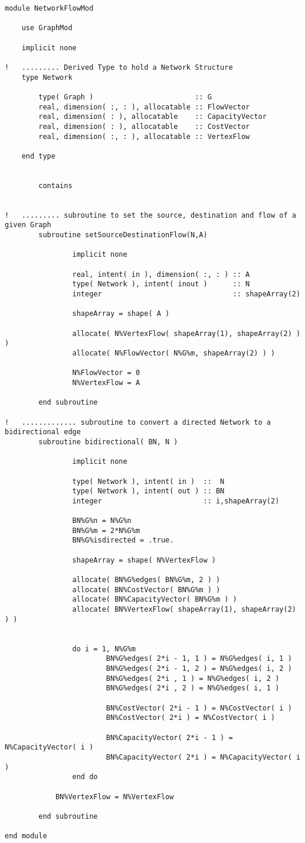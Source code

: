 \documentclass[10pt,a4paper,margin = 1.25cm]{article}
\begin{document}
\begin{lstlisting}
module NetworkFlowMod

    use GraphMod
    
    implicit none

!   ......... Derived Type to hold a Network Structure
    type Network
        
        type( Graph )                        :: G
        real, dimension( :, : ), allocatable :: FlowVector
        real, dimension( : ), allocatable    :: CapacityVector
        real, dimension( : ), allocatable    :: CostVector
        real, dimension( :, : ), allocatable :: VertexFlow
        
    end type
		
		
		contains
		
		
!   ......... subroutine to set the source, destination and flow of a given Graph
		subroutine setSourceDestinationFlow(N,A)
				
				implicit none
				
				real, intent( in ), dimension( :, : ) :: A
				type( Network ), intent( inout )      :: N
				integer                               :: shapeArray(2)
				
				shapeArray = shape( A )
				
				allocate( N%VertexFlow( shapeArray(1), shapeArray(2) ) )
				allocate( N%FlowVector( N%G%m, shapeArray(2) ) )
				
				N%FlowVector = 0
				N%VertexFlow = A
				
		end subroutine
		
!   ............. subroutine to convert a directed Network to a bidirectional edge
		subroutine bidirectional( BN, N )
				
				implicit none
				
				type( Network ), intent( in )  ::  N
				type( Network ), intent( out ) :: BN
				integer                        :: i,shapeArray(2)
				
				BN%G%n = N%G%n
				BN%G%m = 2*N%G%m
				BN%G%isdirected = .true.
				
				shapeArray = shape( N%VertexFlow )
				
				allocate( BN%G%edges( BN%G%m, 2 ) )
				allocate( BN%CostVector( BN%G%m ) )
				allocate( BN%CapacityVector( BN%G%m ) )
				allocate( BN%VertexFlow( shapeArray(1), shapeArray(2) ) )
				
				
				do i = 1, N%G%m
						BN%G%edges( 2*i - 1, 1 ) = N%G%edges( i, 1 )
						BN%G%edges( 2*i - 1, 2 ) = N%G%edges( i, 2 )
						BN%G%edges( 2*i , 1 ) = N%G%edges( i, 2 )
						BN%G%edges( 2*i , 2 ) = N%G%edges( i, 1 )
						
						BN%CostVector( 2*i - 1 ) = N%CostVector( i )
						BN%CostVector( 2*i ) = N%CostVector( i )
						
						BN%CapacityVector( 2*i - 1 ) = N%CapacityVector( i )
						BN%CapacityVector( 2*i ) = N%CapacityVector( i )						
				end do
			
			BN%VertexFlow = N%VertexFlow
			
		end subroutine
		
end module
\end{lstlisting}
\end{document}
